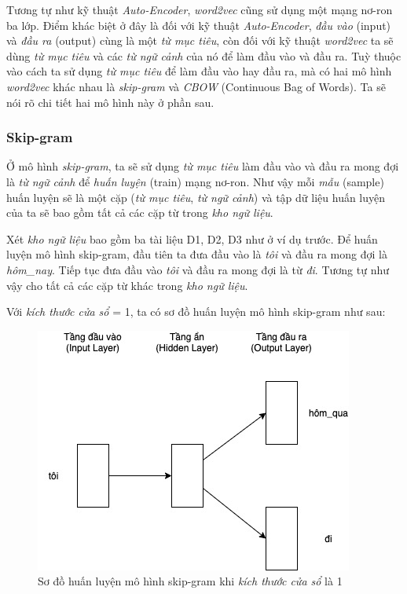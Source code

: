 Tương tự như kỹ thuật \textit{Auto-Encoder}, \textit{word2vec} cũng sử dụng một mạng nơ-ron ba lớp. Điểm khác biệt ở đây là đối với kỹ thuật \textit{Auto-Encoder}, \textit{đầu vào} (input) và \textit{đầu ra} (output) cùng là một \textit{từ mục tiêu}, còn đối với kỹ thuật \textit{word2vec} ta sẽ dùng \textit{từ mục tiêu} và các \textit{từ ngữ cảnh} của nó để làm đầu vào và đầu ra. Tuỳ thuộc vào cách ta sử dụng \textit{từ mục tiêu} để làm đầu vào hay đầu ra, mà có hai mô hình \textit{word2vec} khác nhau là \textit{skip-gram} và \textit{CBOW} (Continuous Bag of Words). Ta sẽ nói rõ chi tiết hai mô hình này ở phần sau.

\subsubsection{Skip-gram}
Ở mô hình \textit{skip-gram}, ta sẽ sử dụng \textit{từ mục tiêu} làm đầu vào và đầu ra mong đợi là \textit{từ ngữ cảnh} để \textit{huấn luyện} (train) mạng nơ-ron. Như vậy mỗi \textit{mẫu} (sample) huấn luyện sẽ là một cặp (\textit{từ mục tiêu}, \textit{từ ngữ cảnh}) và tập dữ liệu huấn luyện của ta sẽ bao gồm tất cả các cặp từ trong \textit{kho ngữ liệu}.

Xét \textit{kho ngữ liệu} bao gồm ba tài liệu D1, D2, D3 như ở ví dụ trước. Để huấn luyện mô hình skip-gram, đầu tiên ta đưa đầu vào là \textit{tôi} và đầu ra mong đợi là \textit{hôm\_nay}. Tiếp tục đưa đầu vào \textit{tôi} và đầu ra mong đợi là từ \textit{đi}.  Tương tự như vậy cho tất cả các cặp từ khác trong \textit{kho ngữ liệu}.

Với \textit{kích thước cửa sổ} = 1, ta có sơ đồ huấn luyện mô hình skip-gram như sau:

\begin{figure}[!h]
	\centering
		\includegraphics[width=0.5\columnwidth]{chapter04/figure/skip-gram-window-size-1.jpg}
        \caption{Sơ đồ huấn luyện mô hình skip-gram khi \textit{kích thước cửa sổ} là 1}
        \label{fig:skip_gram_window_size_1}
\end{figure}

